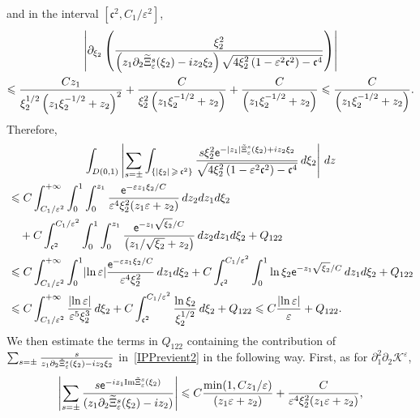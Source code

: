 \documentclass[10pt]{amsart}
\theoremstyle{definition}\newtheorem{defi}[theo]{Definition}\newtheorem{rema}[theo]{Remark}\newtheorem{exam}[theo]{Example}\newtheorem{exem}[theo]{Example}\newtheorem{nota}[theo]{Notation}
\newcommand*\p{\partial}
\newcommand{\Imm}{\mathrm{Im}}
\newcommand*\BK{\mathcal{K}}
\newcommand*\ex{{\sf e}}
\newcommand*\cs{{\mathfrak c}}
\newcommand*\ii{\infty}
\newcommand*\gs{\geqslant }
\newcommand*\ls{\leqslant }
\newcommand*\e{\varepsilon}
\renewcommand*\t{\tilde}
\let\oldtilde\tilde
\renewcommand*{\tilde}[1]{\mathchoice{\widetilde{#1}}{\widetilde{#1}}{\oldtilde{#1}}{\oldtilde{#1}}}
\begin{document}
and in the interval $ [\cs^2, C_1 / \e^{2}] $,
\begin{multline}\label{IPPrevient2}
 \left\lvert \p_{\xi_2} \left(\frac{ \xi_2^2 }{ \left(z_1 \p_2 \t\Xi_\e^s (\xi_2) - i z_2 \xi_2\right) \sqrt{ 4 \xi_2^2\left(1 - \e^2 \cs^2\right) - \cs^4}}
\right)\right\rvert
\\ 
\ls \frac{ C z_1 }{ \xi_2^{1/2}\left(z_1 \xi_2^{-1/2} + z_2\right)^2 } + \frac{ C }{ \xi_2^{2}\left(z_1 \xi_2^{-1/2} + z_2\right)} + \frac{ C }{\left(z_1 \xi_2^{-1/2} + z_2\right)}
\ls
\frac{ C }{\left(z_1 \xi_2^{-1/2} + z_2\right)}.
\end{multline}
Therefore,
\begin{multline*}
\int_{D(0,1)}  \left\lvert \sum_{s =\pm } \int_{\left\{ |\xi_2 |\,\gs\,\cs^{2}\right\}} \frac{ s \xi_2^2 \ex^{- |z_1| \t\Xi_\e^s (\xi_2) + i z_2 \xi_2} }{
\sqrt{ 4 \xi_2^2 \left(1 - \e^2 \cs^2\right) - \cs^4 } } \, d\xi_2 \right\rvert \, dz
\\
\begin{aligned}
 & \ls C \int_{C_1/ \e^{2} }^{+\ii} \int_0^1 \int_0^{z_1}
\frac{ \ex^{- \e z_1 \xi_2/C} }{ \e^4 \xi_2^2 (z_1 \e + z_2) } \, dz_2 dz_1 d\xi_2
\\ & \quad + C \int_{\cs^2}^{ C_1 / \e^{2} } \int_0^1 \int_0^{z_1}
\frac{ \ex^{- z_1 \sqrt{\xi_2} / C} }{\left(z_1 / \sqrt{\xi_2} + z_2\right) } \, dz_2 dz_1 d\xi_2 + Q_{122}
\\ &
\ls C \int_{ C_1 / \e^{2} }^{+\ii} \int_0^1
\lvert \ln \e \rvert \frac{ \ex^{- \e z_1 \xi_2 /C } }{ \e^4 \xi_2^2 }\, dz_1 d \xi_2 + C \int_{\cs^2}^{ C_1 /\e^{2} } \int_0^1 \ln \xi_2 \ex^{- z_1 \sqrt{\xi_2} /C} \, dz_1 d\xi_2 + Q_{122}
\\ &
\ls C \int_{ C_1 / \e^{2} }^{+\ii}
\frac{ \lvert \ln \e \rvert}{\e^5 \xi_2^3 } \, d \xi_2 + C \int_{\cs^2}^{ C_1 /\e^{2} } \frac{ \ln \xi_2 }{ \xi_2^{1/2} } \, d\xi_2 + Q_{122}
\ls C \frac{ \lvert \ln \e \rvert }{ \e } + Q_{122}.
\end{aligned}
\end{multline*}
We then estimate the terms in $ Q_{122} $ containing the contribution of $ \sum_{s=\pm} \frac{s}{z_1 \p_2 \t\Xi_\e^s (\xi_2) - i z_2 \xi_2} $ in~\eqref{IPPrevient2} in the following way. First, as for $ \p_1^2 \p_2 \BK^\e $,
\begin{align*}
\left\lvert \sum_{s = \pm} \frac{s \ex^{- i z_1 {\Imm} \t\Xi_\e^s (\xi_2) } }{ (z_1 \p_2 \t\Xi_\e^s (\xi_2) - i z_2) } \right\rvert
\ls C \frac{ \min (1, Cz_1 / \e) }{(z_1 \e + z_2)} + \frac{C }{ \e^4 \xi_2^2 (z_1 \e + z_2) },
\end{align*}
\end{document}
